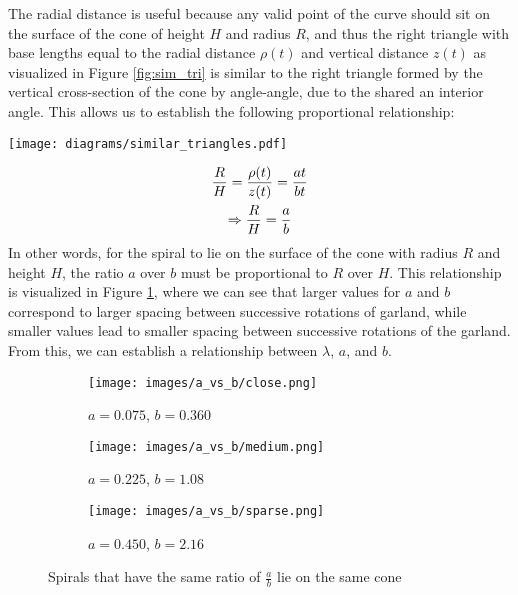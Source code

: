The radial distance is useful because any valid point of the curve should sit on the surface of the cone of height $H$ and radius $R$, and thus the right triangle with base lengths equal to the radial distance $\rho(t)$ and vertical distance $z(t)$ as visualized in Figure \ref{fig:sim_tri} is similar to the right triangle formed by the vertical cross-section of the cone by angle-angle, due to the shared an interior angle. This allows us to establish the following proportional relationship:

\noindent
\begin{minipage}[b]{0.3\textwidth}
    \vfill
    \texttt{[image: diagrams/similar\_triangles.pdf]}
     \label{fig:sim_tri}
    \vspace*{-5pt}
\end{minipage}
\begin{minipage}[b]{0.7\textwidth}
    \begin{gather}
        \frac{R}{H} = \frac{\rho(t)}{z(t)} = \frac{at}{bt} \notag \\
        \Rightarrow \frac{R}{H} = \frac{a}{b} \label{eq:proportion}
    \end{gather}
    In other words, for the spiral to lie on the surface of the cone with radius $R$ and height $H$, the ratio $a$ over $b$ must be proportional to $R$ over $H$. This relationship is visualized in Figure \ref{fig:param_comparison}, where we can see that larger values for $a$ and $b$ correspond to larger spacing between successive rotations of garland, while smaller values lead to smaller spacing between successive rotations of the garland. From this, we can establish a relationship between $\lambda$, $a$, and $b$.
\end{minipage}

\vspace*{5pt}
\begin{figure}[H]
    \centering
    \begin{subfigure}[t]{0.28\textwidth}
        \centering
        \texttt{[image: images/a\_vs\_b/close.png]}
        \caption{$a=0.075$, $b=0.360$}
    \end{subfigure}
    \begin{subfigure}[t]{0.28\textwidth}
        \centering
        \texttt{[image: images/a\_vs\_b/medium.png]}
        \caption{$a=0.225$, $b=1.08$}
    \end{subfigure}
    \begin{subfigure}[t]{0.28\textwidth}
        \centering
        \texttt{[image: images/a\_vs\_b/sparse.png]}
        \caption{$a=0.450$, $b=2.16$}
    \end{subfigure}
    \caption{Spirals that have the same ratio of $\frac{a}{b}$ lie on the same cone} \label{fig:param_comparison}
\end{figure}

